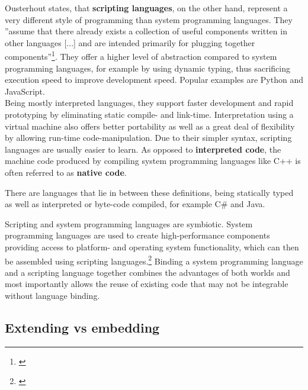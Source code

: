 Ousterhout states, that \textbf{scripting languages}, on the other hand, represent a very different style of programming than system programming languages. They ''assume that there already exists a collection of useful components written in other languages [...] and are intended primarily for plugging together components''\footnote{\citep{Ousterhout}}. They offer a higher level of abstraction compared to system programming languages, for example by using dynamic typing, thus sacrificing execution speed to improve development speed. Popular examples are Python and JavaScript.
\\ Being mostly interpreted languages, they support faster development and rapid prototyping by eliminating static compile- and link-time. Interpretation using a virtual machine also offers better portability as well as a great deal of flexibility by allowing run-time code-manipulation. Due to their simpler syntax, scripting languages are usually easier to learn. 
As opposed to \textbf{interpreted code}, the machine code produced by compiling system programming languages like C++ is often referred to as \textbf{native code}.

There are languages that lie in between these definitions, being statically typed as well as interpreted or byte-code compiled, for example C\# and Java. 

Scripting and system programming languages are symbiotic. System programming languages are used to create high-performance components providing access to platform- and operating system functionality, which can then be assembled using scripting languages.\footnote{\citep{Ousterhout}} Binding a system programming language and a scripting language together combines the advantages of both worlds and most importantly allows the reuse of existing code that may not be integrable without language binding.

\subsection{Extending vs embedding}

